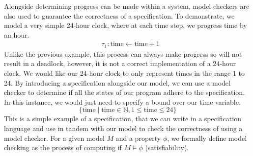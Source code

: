 Alongside determining progress can be made within a system, model checkers are also used to guarantee the correctness of a specification. To demonstrate, we model a very simple 24-hour clock, where at each time step, we progress time by an hour.
\[
\begin{aligned}
& \tau_1: \text{time} \leftarrow \text{time} + 1
\end{aligned}
\]
Unlike the previous example, this process can always make progress so will not result in a deadlock, however, it is not a correct implementation of a 24-hour clock. We would like our 24-hour clock to only represent times in the range 1 to 24. By introducing a specification alongside our model, we can use a model checker to determine if all the states of our program adhere to the specification. In this instance, we would just need to specify a bound over our time variable.
\[
\{ \text{time} \mid \text{time} \in \mathbb{N}, 1 \leq \text{time} \leq 24 \}
\]
This is a simple example of a specification, that we can write in a specification language and use in tandem with our model to check the correctness of using a model checker. For a given model $M$ and a property $\phi$, we formally define model checking as the process of computing if $M \models \phi$ (satisfiability).
